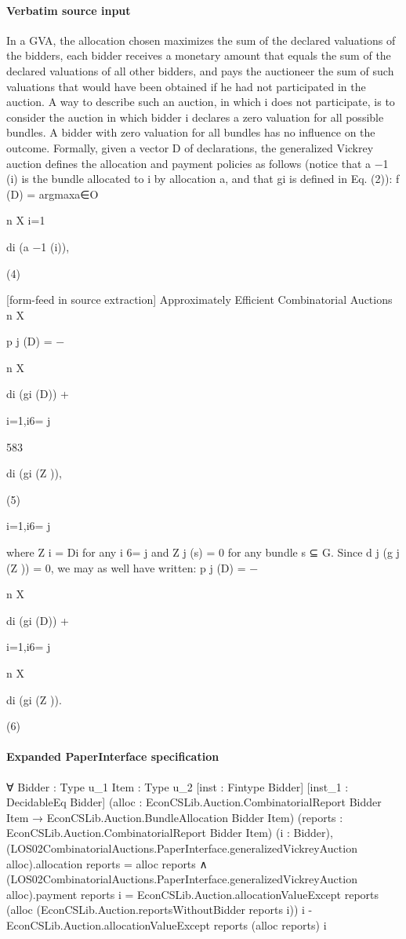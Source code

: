 \documentclass[10pt]{article}
\begin{document}
\paragraph{Verbatim source input}
\begin{ReviewVerbatim}
In a GVA, the allocation chosen maximizes the sum of the declared valuations
of the bidders, each bidder receives a monetary amount that equals the sum of the
declared valuations of all other bidders, and pays the auctioneer the sum of such
valuations that would have been obtained if he had not participated in the auction.
A way to describe such an auction, in which i does not participate, is to consider
the auction in which bidder i declares a zero valuation for all possible bundles. A
bidder with zero valuation for all bundles has no influence on the outcome.
Formally, given a vector D of declarations, the generalized Vickrey auction
defines the allocation and payment policies as follows (notice that a −1 (i) is the
bundle allocated to i by allocation a, and that gi is defined in Eq. (2)):
f (D) = argmaxa∈O

n
X
i=1

di (a −1 (i)),

(4)


[form-feed in source extraction]
Approximately Efficient Combinatorial Auctions
n
X

p j (D) = −

n
X

di (gi (D)) +

i=1,i6= j

583

di (gi (Z )),

(5)

i=1,i6= j

where Z i = Di for any i 6= j and Z j (s) = 0 for any bundle s ⊆ G. Since
d j (g j (Z )) = 0, we may as well have written:
p j (D) = −

n
X

di (gi (D)) +

i=1,i6= j

n
X

di (gi (Z )).

(6)
\end{ReviewVerbatim}


\paragraph{Expanded PaperInterface specification}
\begin{ReviewVerbatim}
∀ {Bidder : Type u_1} {Item : Type u_2} [inst : Fintype Bidder] [inst_1 : DecidableEq Bidder]
  (alloc : EconCSLib.Auction.CombinatorialReport Bidder Item → EconCSLib.Auction.BundleAllocation Bidder Item)
  (reports : EconCSLib.Auction.CombinatorialReport Bidder Item) (i : Bidder),
  (LOS02CombinatorialAuctions.PaperInterface.generalizedVickreyAuction alloc).allocation reports = alloc reports ∧
    (LOS02CombinatorialAuctions.PaperInterface.generalizedVickreyAuction alloc).payment reports i =
      EconCSLib.Auction.allocationValueExcept reports (alloc (EconCSLib.Auction.reportsWithoutBidder reports i)) i -
        EconCSLib.Auction.allocationValueExcept reports (alloc reports) i
\end{ReviewVerbatim}
\end{document}
